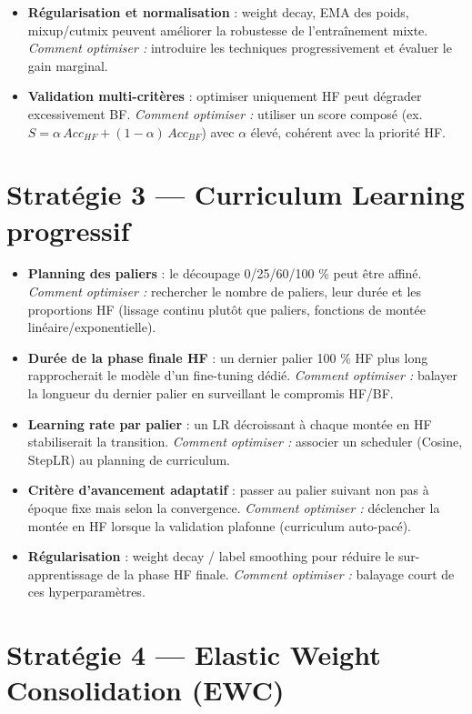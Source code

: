 \documentclass[11pt,a4paper,openany]{book}
\begin{document}
\begin{itemize}
  \item \textbf{Régularisation et normalisation} : weight decay, EMA des poids, mixup/cutmix peuvent améliorer la robustesse de l'entraînement mixte. \textit{Comment optimiser :} introduire les techniques progressivement et évaluer le gain marginal.
  \item \textbf{Validation multi-critères} : optimiser uniquement HF peut dégrader excessivement BF. \textit{Comment optimiser :} utiliser un score composé (ex. $S=\alpha\,Acc_{HF}+(1-\alpha)\,Acc_{BF}$) avec $\alpha$ élevé, cohérent avec la priorité HF.
\end{itemize}

\section{Stratégie 3 — Curriculum Learning progressif}

\begin{itemize}
  \item \textbf{Planning des paliers} : le découpage 0/25/60/100 \% peut être affiné. \textit{Comment optimiser :} rechercher le nombre de paliers, leur durée et les proportions HF (lissage continu plutôt que paliers, fonctions de montée linéaire/exponentielle).
  \item \textbf{Durée de la phase finale HF} : un dernier palier 100 \% HF plus long rapprocherait le modèle d'un fine-tuning dédié. \textit{Comment optimiser :} balayer la longueur du dernier palier en surveillant le compromis HF/BF.
  \item \textbf{Learning rate par palier} : un LR décroissant à chaque montée en HF stabiliserait la transition. \textit{Comment optimiser :} associer un scheduler (Cosine, StepLR) au planning de curriculum.
  \item \textbf{Critère d'avancement adaptatif} : passer au palier suivant non pas à époque fixe mais selon la convergence. \textit{Comment optimiser :} déclencher la montée en HF lorsque la validation plafonne (curriculum auto-pacé).
  \item \textbf{Régularisation} : weight decay / label smoothing pour réduire le sur-apprentissage de la phase HF finale. \textit{Comment optimiser :} balayage court de ces hyperparamètres.
\end{itemize}

\section{Stratégie 4 — Elastic Weight Consolidation (EWC)}
\end{document}
